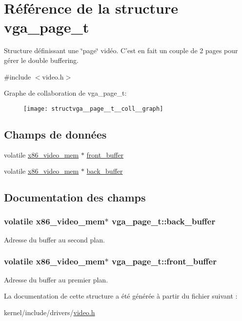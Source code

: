 \hypertarget{structvga__page__t}{\section{Référence de la structure vga\-\_\-page\-\_\-t}
\label{structvga__page__t}
}


Structure définissant une \char`\"{}page\char`\"{} vidéo. C'est en fait un couple de 2 pages pour gérer le double buffering.  




{\ttfamily \#include $<$video.\-h$>$}



Graphe de collaboration de vga\-\_\-page\-\_\-t\-:
\nopagebreak
\begin{figure}[H]
\begin{center}
\leavevmode
\texttt{[image: structvga\_\_page\_\_t\_\_coll\_\_graph]}
\end{center}
\end{figure}
\subsection*{Champs de données}
\begin{DoxyCompactItemize}
\item 
volatile \hyperlink{structx86__video__mem}{x86\-\_\-video\-\_\-mem} $\ast$ \hyperlink{structvga__page__t_a8f820f9799bc5f9886e9f74c09e24841}{front\-\_\-buffer}
\item 
volatile \hyperlink{structx86__video__mem}{x86\-\_\-video\-\_\-mem} $\ast$ \hyperlink{structvga__page__t_aaad0350a467498fb34a0b8b1586ac76c}{back\-\_\-buffer}
\end{DoxyCompactItemize}


\subsection{Documentation des champs}
\hypertarget{structvga__page__t_aaad0350a467498fb34a0b8b1586ac76c}{
\subsubsection[{back\-\_\-buffer}]{\setlength{\rightskip}{0pt plus 5cm}volatile {\bf x86\-\_\-video\-\_\-mem}$\ast$ vga\-\_\-page\-\_\-t\-::back\-\_\-buffer}}\label{structvga__page__t_aaad0350a467498fb34a0b8b1586ac76c}
Adresse du buffer au second plan. \hypertarget{structvga__page__t_a8f820f9799bc5f9886e9f74c09e24841}{
\subsubsection[{front\-\_\-buffer}]{\setlength{\rightskip}{0pt plus 5cm}volatile {\bf x86\-\_\-video\-\_\-mem}$\ast$ vga\-\_\-page\-\_\-t\-::front\-\_\-buffer}}\label{structvga__page__t_a8f820f9799bc5f9886e9f74c09e24841}
Adresse du buffer au premier plan. 

La documentation de cette structure a été générée à partir du fichier suivant \-:\begin{DoxyCompactItemize}
\item 
kernel/include/drivers/\hyperlink{video_8h}{video.\-h}\end{DoxyCompactItemize}
